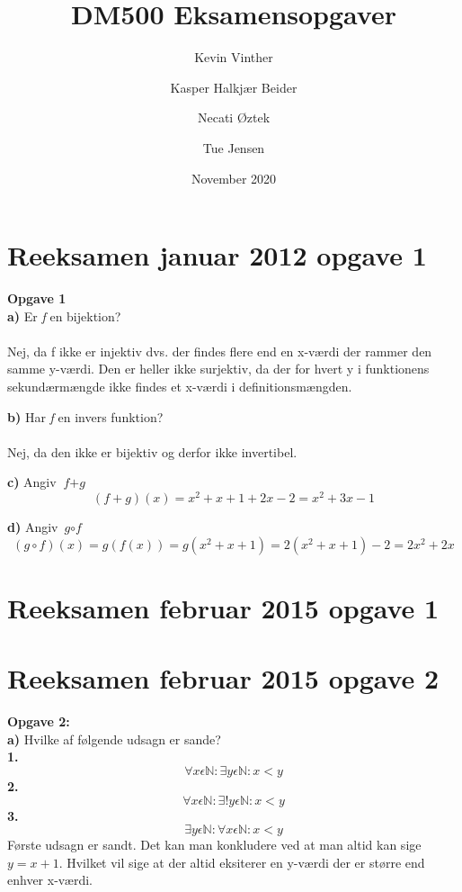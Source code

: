 \documentclass{article}
\title{DM500 Eksamensopgaver}
\author{ Kevin Vinther \and Kasper Halkjær Beider \and Necati Øztek \and Tue Jensen }
\date{November 2020}
\begin{document}
\maketitle

\newpage

\section{Reeksamen januar 2012 opgave 1}
\textbf{Opgave 1}\\

\textbf{a)} Er \textit{f} en bijektion?\\
\\Nej, da f ikke er injektiv dvs. der findes flere end en x-værdi der rammer den samme y-værdi. Den er heller ikke surjektiv, da der for hvert y i funktionens sekundærmængde ikke findes et x-værdi i definitionsmængden.

\textbf{b)} Har \textit{f} en invers funktion?\\
\\Nej, da den ikke er bijektiv og derfor ikke invertibel.

\textbf{c)} Angiv $\textit{f} + \textit{g}$
\[(f+g)(x)=x^2+x+1+2x-2=x^2+3x-1\]

\textbf{d)} Angiv $\textit{g} \circ \textit{f}$
\[(g \circ f)(x)=g(f(x))=g(x^2+x+1)=2(x^2+x+1)-2=2x^2+2x\]
\section{Reeksamen februar 2015 opgave 1}

\section{Reeksamen februar 2015 opgave 2}

\textbf{Opgave 2:}\\
\textbf{a)} Hvilke af følgende udsagn er sande?\\
\textbf{1.} 
\begin{displaymath}
\forall x \epsilon \mathbb{N}: \exists y \epsilon \mathbb{N}: x<y
\end{displaymath}
\textbf{2.}\begin{displaymath}
\forall x \epsilon \mathbb{N}: \exists !y \epsilon \mathbb{N}: x<y
\end{displaymath}
\textbf{3.}\begin{displaymath}
\exists y  \epsilon \mathbb{N}: \forall x  \epsilon  \mathbb{N}: x<y
\end{displaymath}
Første udsagn er sandt. Det kan man konkludere ved at man altid kan sige \(y = x + 1\). Hvilket vil sige at der altid eksiterer en y-værdi der er større end enhver x-værdi. 
\end{document}
